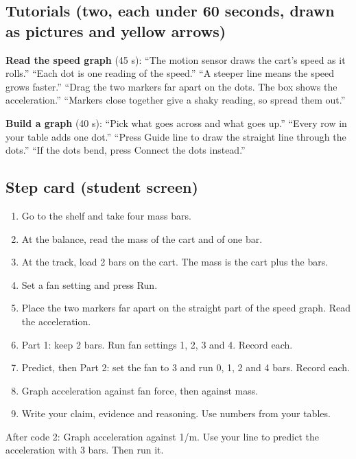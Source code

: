 \documentclass[10pt]{article}
\begin{document}
\subsection{Tutorials (two, each under 60 seconds, drawn as pictures and yellow arrows)}
\textbf{Read the speed graph} (45 s): “The motion sensor draws the cart's speed as it rolls.” “Each dot is one reading of the speed.” “A steeper line means the speed grows faster.” “Drag the two markers far apart on the dots. The box shows the acceleration.” “Markers close together give a shaky reading, so spread them out.”\par
\textbf{Build a graph} (40 s): “Pick what goes across and what goes up.” “Every row in your table adds one dot.” “Press Guide line to draw the straight line through the dots.” “If the dots bend, press Connect the dots instead.”

\subsection{Step card (student screen)}
\begin{enumerate}[label=\arabic*.]
\item Go to the shelf and take four mass bars.
\item At the balance, read the mass of the cart and of one bar.
\item At the track, load 2 bars on the cart. The mass is the cart plus the bars.
\item Set a fan setting and press Run.
\item Place the two markers far apart on the straight part of the speed graph. Read the acceleration.
\item Part 1: keep 2 bars. Run fan settings 1, 2, 3 and 4. Record each.
\item Predict, then Part 2: set the fan to 3 and run 0, 1, 2 and 4 bars. Record each.
\item Graph acceleration against fan force, then against mass.
\item Write your claim, evidence and reasoning. Use numbers from your tables.
\end{enumerate}
After code 2: Graph acceleration against 1/m. Use your line to predict the acceleration with 3 bars. Then run it.
\end{document}
